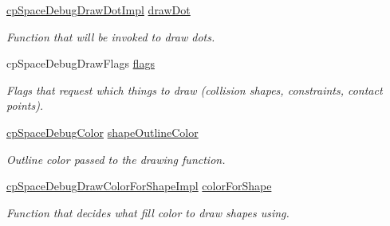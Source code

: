 \begin{DoxyCompactItemize}
\mbox{\label{structcp_space_debug_draw_options_a4003aae132391aa3d57c65f44d61feb3}} 
\mbox{\hyperlink{group__cp_space_gadf9a758a2f1c3b53551829573b722e5a}{cp\+Space\+Debug\+Draw\+Dot\+Impl}} \mbox{\hyperlink{structcp_space_debug_draw_options_a4003aae132391aa3d57c65f44d61feb3}{draw\+Dot}}
\begin{DoxyCompactList}\small\item\em Function that will be invoked to draw dots. \end{DoxyCompactList}\item 
\mbox{\label{structcp_space_debug_draw_options_a1b4b5128c4b70e3642f49ad71d49159f}} 
cp\+Space\+Debug\+Draw\+Flags \mbox{\hyperlink{structcp_space_debug_draw_options_a1b4b5128c4b70e3642f49ad71d49159f}{flags}}
\begin{DoxyCompactList}\small\item\em Flags that request which things to draw (collision shapes, constraints, contact points). \end{DoxyCompactList}\item 
\mbox{\label{structcp_space_debug_draw_options_a5bc64c5754df1f4bc4b7a789e81555f8}} 
\mbox{\hyperlink{structcp_space_debug_color}{cp\+Space\+Debug\+Color}} \mbox{\hyperlink{structcp_space_debug_draw_options_a5bc64c5754df1f4bc4b7a789e81555f8}{shape\+Outline\+Color}}
\begin{DoxyCompactList}\small\item\em Outline color passed to the drawing function. \end{DoxyCompactList}\item 
\mbox{\label{structcp_space_debug_draw_options_a6de88f91bd66ef2f49ca32c3fb6ee145}} 
\mbox{\hyperlink{group__cp_space_gaba1fec950f2b58c7c72ab5ca553bdf43}{cp\+Space\+Debug\+Draw\+Color\+For\+Shape\+Impl}} \mbox{\hyperlink{structcp_space_debug_draw_options_a6de88f91bd66ef2f49ca32c3fb6ee145}{color\+For\+Shape}}
\begin{DoxyCompactList}\small\item\em Function that decides what fill color to draw shapes using. \end{DoxyCompactList}\item 
\mbox{\label{structcp_space_debug_draw_options_a62271599c7cb15d39f6a2b4620173322}} 

\end{DoxyCompactItemize}
